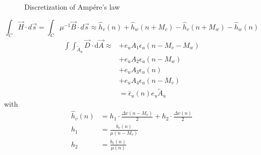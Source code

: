 \begin{figure}
\hfill
\caption{Discretization of Amp\'ere's law}
\end{figure}
\begin{equation}
\int_{\tilde{C}}\vec{H}\cdot d\vec{s}=\int_{\tilde{C}}\mu^{-1}\vec{B}\cdot d\vec{s}\approx
\widehat{h}_{v}(n)
+\widehat{h}_{w}(n+M_{v})
-\widehat{h}_{v}(n+M_{w})
-\widehat{h}_{w}(n)
\label{eq:ampere_left_sample}
\end{equation}
\begin{align}
\int\int_{\tilde{A}_{u}}\vec{D}\cdot\mathrm{d}\vec{A}\approx &+e_{u}A_{1}\epsilon_{u}(n-M_{v}-M_{w}) \nonumber\\
&+e_{u}A_{2}\epsilon_{u}(n-M_{w}) \nonumber\\
&+e_{u}A_{3}\epsilon_{u}(n) \nonumber\\
&+e_{u}A_{4}\epsilon_{u}(n-M_{v}) \nonumber\\
&=\bar{\epsilon}_{u}(n)e_{u}\tilde{A}_{u}
\label{eq:ampere_right}
\end{align}
with 
\begin{align}
\widehat{h}_{v}(n)&=h_{1}\cdot\frac{\Delta v(n-M_{v})}{2}+ h_{2}\cdot\frac{\Delta v(n)}{2}\\
h_{1}&=\frac{b_{v}(n)}{\mu (n-M_{v})}\\
h_{2}&=\frac{b_{v}(n)}{\mu (n)}
\label{eq:megnetic_field}
\end{align}
